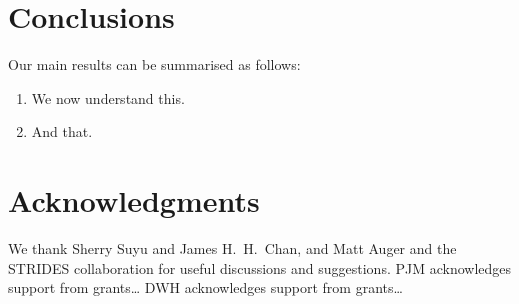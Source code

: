\documentclass[useAMS,usenatbib]{mn2e}
\begin{document}

\section{Conclusions}
\label{sec:concl}

Our main results can be summarised as follows:

\begin{enumerate}

\item We now understand this.

\item And that.

\end{enumerate}



\section*{Acknowledgments}
 
We thank Sherry Suyu and James H.\ H.\ Chan, and Matt Auger and the STRIDES
collaboration for useful discussions and suggestions.
PJM acknowledges support from grants\ldots
DWH acknowledges support from grants\ldots











\label{lastpage}
\bsp
\end{document}
